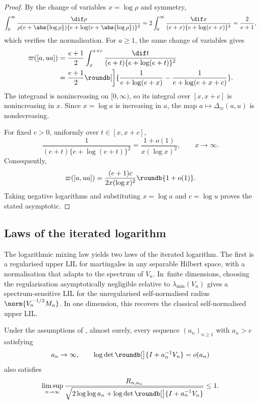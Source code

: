 \documentclass[11pt]{article}
\let\cref\zcref
\begin{document}
\begin{proof}
By the change of variables $x=\log\rho$ and symmetry,
\[
  \int_0^\infty\frac{\dif\rho}{\rho(e+\abs{\log\rho})\{e+\log(e+\abs{\log\rho})\}^2}=2\int_0^\infty\frac{\dif x}{(e+x)\{e+\log(e+x)\}^2}=\frac{2}{e+1},
\]
which verifies the normalisation. For $a\geq1$, the same change of variables gives
\begin{align*}
  \varpi([a,ua])&=\frac{e+1}{2}\int_x^{x+c}\frac{\dif t}{(e+t)\{e+\log(e+t)\}^2}\\
  &=\frac{e+1}{2}\roundb[\bigg]{\frac{1}{e+\log(e+x)}-\frac{1}{e+\log(e+x+c)}}.
\end{align*}
The integrand is nonincreasing on $[0,\infty)$, so its integral over $[x,x+c]$ is nonincreasing in $x$. Since $x=\log a$ is increasing in $a$, the map $a\mapsto\Delta_\varpi(a,u)$ is nondecreasing.

For fixed $c>0$, uniformly over $t\in[x,x+c]$,
\[
  \frac{1}{(e+t)\{e+\log(e+t)\}^2}=\frac{1+o(1)}{x(\log x)^2}, \qquad x\to\infty.
\]
Consequently,
\[
  \varpi([a,ua])=\frac{(e+1)c}{2x(\log x)^2}\roundb{1+o(1)}.
\]
Taking negative logarithms and substituting $x=\log a$ and $c=\log u$ proves the stated asymptotic.
\end{proof}








\subsection{Laws of the iterated logarithm}

The logarithmic mixing law yields two laws of the iterated logarithm. The first is a regularised upper LIL for martingales in any separable Hilbert space, with a normalisation that adapts to the spectrum of $V_n$. In~finite dimensions, choosing the regularisation asymptotically negligible relative to $\lambda_{\min}(V_n)$ gives a spectrum-sensitive LIL for the unregularised self-normalised radius $\norm{V_n^{-1/2}M_n}$. In one dimension, this recovers the classical self-normalised upper LIL.

\begin{corollary}[restate=corRegularisedLIL,name=]\label{cor:regularised-lil}
Under the assumptions of \cref{thm:bennett-logdet-potential}, almost surely, every sequence $(a_n)_{n\geq1}$ with $a_n>e$ satisfying
\[
  a_n\to\infty, \qquad \log\det\roundb[\big]{I+a_n^{-1}V_n}=o(a_n)
\]
also satisfies
\[
  \limsup_{n\to\infty}\frac{R_{n,a_n}}{\sqrt{2\log\log a_n+\log\det\roundb[\big]{I+a_n^{-1}V_n}}}\leq1.
\]
\end{corollary}
\end{document}
